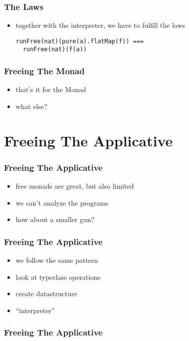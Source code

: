 \documentclass{beamer}
\begin{document}
\begin{frame}[fragile]
  \frametitle{The Laws}
  \begin{itemize}
  \item together with the interpreter, we have to fulfill the laws
    \begin{verbatim}
runFree(nat)(pure(a).flatMap(f)) ===
  runFree(nat)(f(a))
    \end{verbatim}
  \end{itemize}
\end{frame}

\begin{frame}
  \frametitle{Freeing The Monad}
  \begin{itemize}
  \item that's it for the Monad
  \item what else?
  \end{itemize}
\end{frame}

\section{Freeing The Applicative}\label{sec:free-applicative}

\begin{frame}
  \frametitle{Freeing The Applicative}
  \begin{itemize}
  \item free monads are great, but also limited
  \item we can't analyze the programs
  \item how about a smaller gun?
  \end{itemize}
\end{frame}

\begin{frame}
  \frametitle{Freeing The Applicative}
  \begin{itemize}
  \item we follow the same pattern
  \item look at typeclass operations
  \item create datastructure
  \item ``interpreter''
  \end{itemize}
\end{frame}

\begin{frame}
  \frametitle{Freeing The Applicative}

\end{frame}
\end{document}
